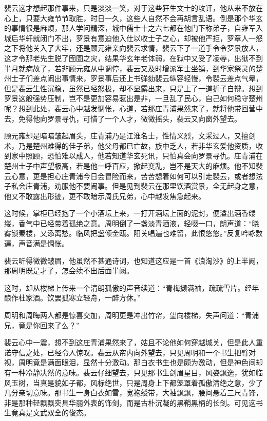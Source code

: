 裴云这才想起那件事来，只是淡淡一笑，对于这些狂生文士的攻讦，他从来不放在心上，只要大雍节节取胜，时日一久，这些人自然不会再胡言乱语。倒是那个华玄的事情很是麻烦，那人学问精深，城中儒士十之六七都在他门下称弟子，自雍军入城后华轩就闭门不出，罗景有意迫他入仕以收士子之心，却被他严拒，罗章人一怒之下将他关入了大牢，还是顾元雍亲向裴云求情，裴云下了一道手令令罗景放人，这才令那老先生脱了囹圄之灾，结果华玄年老体弱，在狱中又受了凌辱，出狱不到半月就病故了，若非顾元雍从中调停，裴云又及时增派军士坐镇，到华家祭灵的楚州士子们差点闹出事情来，罗景事后还上书弹劾裴云纵容轻慢，令裴云差点气晕，但是裴云生性沉稳，虽然已经怒极，却不显露出来，只是上了一道折子自辩。想到罗景这般强势压制，岂不是更加容易惹出是非，一旦乱了民心，自己如何稳守楚州呢？想到此处，裴云心中越发惆怅，心道，若那庄青浦果然来了，就将他带回营中去，免得他向罗景寻仇，可惜了一个人才，微微摇头，裴云又向窗外望去。

顾元雍却是暗暗皱起眉头，庄青浦乃是江淮名士，性情义烈，文采过人，又擅剑术，乃是楚州难得的佳子弟，他父母都已亡故，族中乏人，若非华玄爱他资质，收到家中照顾，恐怕难以成人，他若知道华玄死讯，只怕真会向罗景寻仇。庄青浦在楚州士子中声望极高，若是他一呼百应，掀起变乱，岂不是天大的麻烦。他不知裴云心意，更是担心庄青浦今日会冒险而来，苦苦想着如何可以引走裴云，或者想法子私会庄青浦，劝服他不要闹事。但是见到裴云在那里饮酒赏景，全无起身之意，他又不敢露出形迹，更不敢暗示周氏兄弟，心中越发焦急起来。

这时候，掌柜已经抱了一个小酒坛上来，一打开酒坛上面的泥封，便溢出酒香缕缕，香气中已经带着孤绝之意。周明倒了一盏淡青酒液，轻啜一口，朗声道：“晓雾锁秦楼，又添离愁。临风把盏倾金瓯。阳关唱遍也难留，此恨悠悠。”反复吟咏数遍，声音满是惆怅。

裴云听得微微皱眉，他虽然不甚通诗词，也知道这应是一首《浪淘沙》的上半阙，那周明既是才子，怎会续不出后面半阙。

这时，却从楼梯上传来一个清朗孤傲的声音续道：“青梅撷满袖，疏疏雪片。经年酿作杜家酒。饮罢孤寒立轻舟，一醉方休。”

周明和周晦两人都是惊喜交加，周明更是冲出竹帘，望向楼梯，失声问道：“青浦兄，竟是你回来了么？”

裴云心中一震，想不到这庄青浦果然来了，姑且不论他如何穿越城关，但是此人重诺守信之处，已经令人惊叹。裴云从帘内向外望去，只见周明和一个书生把臂对视，周明竟是满面眼泪，显然十分激动。那白衣书生也是颇为激动，但是神色间却有一种冷静决然的意味。裴云仔细望去，只见那书生剑眉星目，风姿飘逸，犹如临风玉树，当真是貌如子都，风标绝世，只是周身上下都笼罩着孤傲清绝之意，少了几分亲切意味。那书生一身白衣如雪，宽袍绶带，大袖飘飘，腰间悬着三尺青锋，非是那种轻飘飘突具华丽外表的饰剑，而是古朴沉凝的黑鞘黑柄的长剑。可见这书生竟真是文武双全的俊杰。

